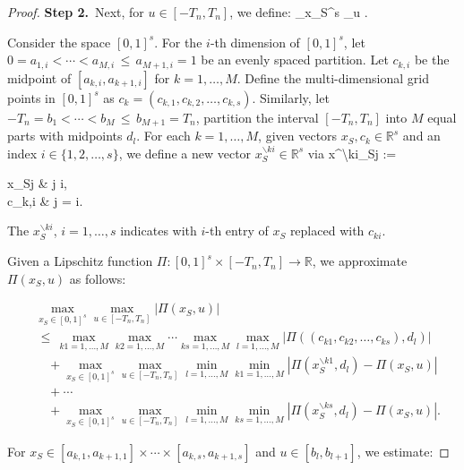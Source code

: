 \documentclass[twoside,11pt]{article}
\makeatletter
\newcommand{\discardlabel}[1]{}
\newcommand{\discardtwo}[2]{}
\newcommand{\legacyref}[1]{\textup{[source ref.]}}
\newcommand{\legacyeqref}[1]{\textup{[source equation]}}
\newenvironment{legacycomparison}{%
  \begingroup\color{legacygray}%
  \let\label\discardlabel
  \let\originallabel\discardlabel
  \let\ref\legacyref
  \let\pageref\legacyref
  \let\eqref\legacyeqref
  \let\cref\legacyref
  \let\Cref\legacyref
  \let\autoref\legacyref
  \let\aliasref\discardtwo
}{\endgroup}
\newcommand{\aliasref}[2]{%
  \@ifundefined{r@#2}{}{%
    \expandafter\let\csname r@#1\expandafter\endcsname\csname r@#2\endcsname}}
\makeatother
\begin{document}
\begin{legacycomparison}
\begin{proof}
\par\medskip\noindent\textbf{Step 2.}\ 
Next, for $u \in [-T_n, T_n]$, we define:
\bea
\max_{x_S\in[0,1]^s} \max_{u \in [-T_n,T_n]} .
\bea 


Consider the space $[0,1]^s$. For the $i$-th dimension of $[0,1]^s$, let $0 = a_{1,i} < \cdots < a_{M,i} \,\leq\, a_{M+1,i} = 1$ be an evenly spaced partition. Let $c_{k,i}$ be the midpoint of $[a_{k,i}, a_{k+1,i}]$ for $k = 1, \ldots, M$. Define the multi-dimensional grid points in $[0,1]^s$ as $c_k = (c_{k,1}, c_{k,2}, \ldots, c_{k,s})$. Similarly, let $ -T_n = b_1 < \cdots < b_M \,\leq\, b_{M+1} = T_n $, partition the interval $[-T_n, T_n]$ into $M$ equal parts with midpoints $d_l$. 
For each $k = 1, \dots, M$, 
given vectors $x_S, c_k \in \mathbb{R}^s$ and an index $i \in \{1, 2, \ldots, s\}$, we define a new vector $x_S^{\backslash ki} \in \mathbb{R}^s$ via
\bea
x^{\backslash ki}_{Sj} := 
\begin{cases} 
x_{Sj} &  j \neq i,\\
c_{k,i} & \text{if } j = i.
\end{cases}
\bea
The $x_S^{\backslash ki}$, $i = 1, \dots, s$ indicates with $i$-th entry of $x_S$ replaced with $c_{ki}$. 


Given a Lipschitz function $\Pi: [0,1]^s \times [-T_n, T_n] \to \mathbb{R}$, we approximate $\Pi(x_S,u)$ as follows:

\begin{align*}
    &\max_{x_S \in [0,1]^s} \max_{u \in [-T_n, T_n]} |\Pi(x_S,u)| \\
    &\,\le\, \max_{k1= 1, \dots, M} \max_{k2= 1, \dots, M} \cdots \max_{ks= 1, \dots, M} \max_{l= 1, \dots, M} |\Pi((c_{k1}, c_{k2}, \ldots, c_{ks}), d_l)| \\
    &\quad + \max_{x_S \in [0,1]^s} \max_{u\in[-T_n,T_n]} \min_{l= 1, \dots, M}\min_{k1 = 1, \dots, M} |\Pi(x_S^{\backslash k1}, d_l) - \Pi(x_S,u)|
    \\
    &\quad+ \cdots \\
    &\quad + \max_{x_S \in [0,1]^s} \max_{u\in[-T_n,T_n]} \min_{l= 1, \dots, M}\min_{ks = 1, \dots, M} |\Pi(x_S^{\backslash ks}, d_l) - \Pi(x_S,u)|.
\end{align*}



For $x_S \in [a_{k,1}, a_{k+1,1}] \times \cdots \times [a_{k,s}, a_{k+1,s}]$ and $u \in [b_l, b_{l+1}]$, we estimate:


\end{proof}
\end{legacycomparison}
\end{document}
